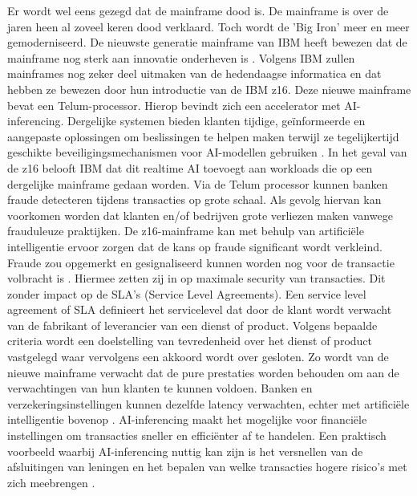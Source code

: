 Er wordt wel eens gezegd dat de mainframe dood is. De mainframe is over de jaren heen al zoveel keren dood verklaard. Toch wordt de 'Big Iron' meer en meer gemoderniseerd. De nieuwste generatie mainframe van IBM heeft bewezen dat de mainframe nog sterk aan innovatie onderheven is \autocite{Almekinders2022}. Volgens IBM zullen mainframes nog zeker deel uitmaken van de hedendaagse informatica en dat hebben ze bewezen door hun introductie van de IBM z16. Deze nieuwe mainframe bevat een Telum-processor. Hierop bevindt zich een accelerator met AI-inferencing. Dergelijke systemen bieden klanten tijdige, geïnformeerde en aangepaste oplossingen om beslissingen te helpen maken terwijl ze tegelijkertijd geschikte beveiligingsmechanismen voor AI-modellen gebruiken \autocite{Cammarota2020}. In het geval van de z16 belooft IBM dat dit realtime AI toevoegt aan workloads die op een dergelijke mainframe gedaan worden. Via de Telum processor kunnen banken fraude detecteren tijdens transacties op grote schaal. Als gevolg hiervan kan voorkomen worden dat klanten en/of bedrijven grote verliezen maken vanwege frauduleuze praktijken. De z16-mainframe kan met behulp van artificiële intelligentie ervoor zorgen dat de kans op fraude significant wordt verkleind. Fraude zou opgemerkt en gesignaliseerd kunnen worden nog voor de transactie volbracht is \autocite{Saran2022}. Hiermee zetten zij in op maximale security van transacties. Dit zonder impact op de SLA's (Service Level Agreements). Een service level agreement of SLA definieert het servicelevel dat door de klant wordt verwacht van de fabrikant of leverancier van een dienst of product. Volgens bepaalde criteria wordt een doelstelling van tevredenheid over het dienst of product vastgelegd waar vervolgens een akkoord wordt over gesloten. Zo wordt van de nieuwe mainframe verwacht dat de pure prestaties worden behouden om aan de verwachtingen van hun klanten te kunnen voldoen. Banken en verzekeringsinstellingen kunnen dezelfde latency verwachten, echter met artificiële intelligentie bovenop \autocite{Saran2022}. AI-inferencing maakt het mogelijke voor financiële instellingen om transacties sneller en efficiënter af te handelen. Een praktisch voorbeeld waarbij AI-inferencing nuttig kan zijn is het versnellen van de afsluitingen van leningen en het bepalen van welke transacties hogere risico's met zich meebrengen \autocite{Saran2022}.


\subsection{}
\label{sec:Quantum computing en IBM z16}

